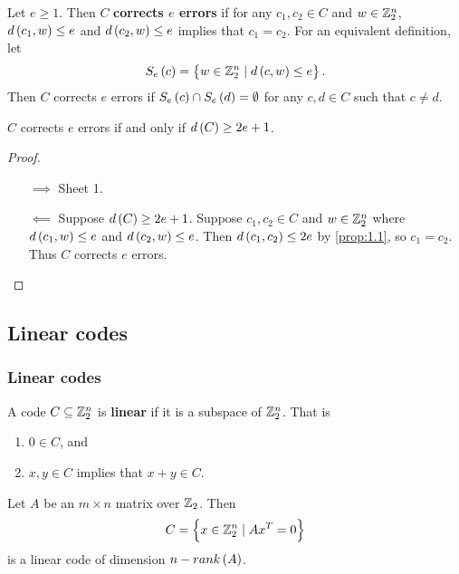 \begin{definition*}
Let $ e \ge 1 $. Then $ C $ \textbf{corrects $ e $ errors} if for any $ c_1, c_2 \in C $ and $ w \in \mathbb{Z}_2^n $, $ d\br{c_1, w} \le e $ and $ d\br{c_2, w} \le e $ implies that $ c_1 = c_2 $. For an equivalent definition, let
$$ S_e\br{c} = \cbr{w \in \Z_2^n \mid d\br{c, w} \le e}. $$
Then $ C $ corrects $ e $ errors if $ S_e\br{c} \cap S_e\br{d} = \emptyset $ for any $ c, d \in C $ such that $ c \ne d $.
\end{definition*}

\begin{proposition}
\label{prop:1.2}
$ C $ corrects $ e $ errors if and only if $ d\br{C} \ge 2e + 1 $.
\end{proposition}

\begin{proof}
\hfill
\begin{itemize}
\item[$ \implies $] Sheet 1.
\item[$ \impliedby $] Suppose $ d\br{C} \ge 2e + 1 $. Suppose $ c_1, c_2 \in C $ and $ w \in \mathbb{Z}_2^n $ where $ d\br{c_1, w} \le e $ and $ d\br{c_2, w} \le e $. Then $ d\br{c_1, c_2} \le 2e $ by \ref{prop:1.1}, so $ c_1 = c_2 $. Thus $ C $ corrects $ e $ errors.
\end{itemize}
\end{proof}

\pagebreak

\subsection{Linear codes}

\subsubsection{Linear codes}

\begin{definition*}
A code $ C \subseteq \mathbb{Z}_2^n $ is \textbf{linear} if it is a subspace of $ \mathbb{Z}_2^n $. That is
\begin{enumerate}
\item $ 0 \in C $, and
\item $ x, y \in C $ implies that $ x + y \in C $.
\end{enumerate}
\end{definition*}

\begin{proposition}
Let $ A $ be an $ m \times n $ matrix over $ \mathbb{Z}_2 $. Then
$$ C = \cbr{x \in \Z_2^n \mid Ax^T = 0} $$
is a linear code of dimension $ n - rank\br{A} $.
\end{proposition}

